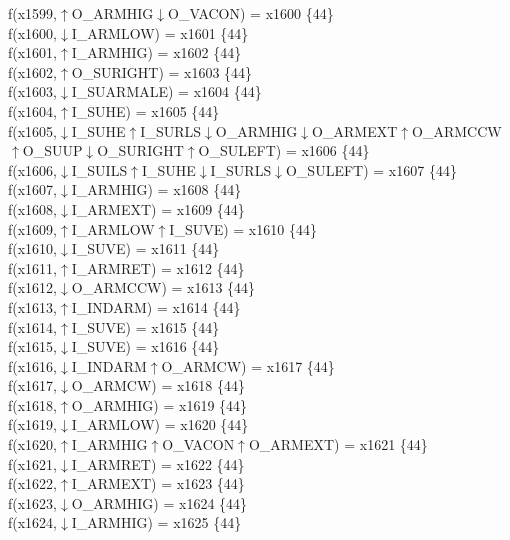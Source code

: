 f(x1599,$\uparrow$O\_ARMHIG$\downarrow$O\_VACON) = x1600 \{44\} \\  
f(x1600,$\downarrow$I\_ARMLOW) = x1601 \{44\} \\  
f(x1601,$\uparrow$I\_ARMHIG) = x1602 \{44\} \\  
f(x1602,$\uparrow$O\_SURIGHT) = x1603 \{44\} \\  
f(x1603,$\downarrow$I\_SUARMALE) = x1604 \{44\} \\  
f(x1604,$\uparrow$I\_SUHE) = x1605 \{44\} \\  
f(x1605,$\downarrow$I\_SUHE$\uparrow$I\_SURLS$\downarrow$O\_ARMHIG$\downarrow$O\_ARMEXT$\uparrow$O\_ARMCCW$\uparrow$O\_SUUP$\downarrow$O\_SURIGHT$\uparrow$O\_SULEFT) = x1606 \{44\} \\  
f(x1606,$\downarrow$I\_SUILS$\uparrow$I\_SUHE$\downarrow$I\_SURLS$\downarrow$O\_SULEFT) = x1607 \{44\} \\  
f(x1607,$\downarrow$I\_ARMHIG) = x1608 \{44\} \\  
f(x1608,$\downarrow$I\_ARMEXT) = x1609 \{44\} \\  
f(x1609,$\uparrow$I\_ARMLOW$\uparrow$I\_SUVE) = x1610 \{44\} \\  
f(x1610,$\downarrow$I\_SUVE) = x1611 \{44\} \\  
f(x1611,$\uparrow$I\_ARMRET) = x1612 \{44\} \\  
f(x1612,$\downarrow$O\_ARMCCW) = x1613 \{44\} \\  
f(x1613,$\uparrow$I\_INDARM) = x1614 \{44\} \\  
f(x1614,$\uparrow$I\_SUVE) = x1615 \{44\} \\  
f(x1615,$\downarrow$I\_SUVE) = x1616 \{44\} \\  
f(x1616,$\downarrow$I\_INDARM$\uparrow$O\_ARMCW) = x1617 \{44\} \\  
f(x1617,$\downarrow$O\_ARMCW) = x1618 \{44\} \\  
f(x1618,$\uparrow$O\_ARMHIG) = x1619 \{44\} \\  
f(x1619,$\downarrow$I\_ARMLOW) = x1620 \{44\} \\  
f(x1620,$\uparrow$I\_ARMHIG$\uparrow$O\_VACON$\uparrow$O\_ARMEXT) = x1621 \{44\} \\  
f(x1621,$\downarrow$I\_ARMRET) = x1622 \{44\} \\  
f(x1622,$\uparrow$I\_ARMEXT) = x1623 \{44\} \\  
f(x1623,$\downarrow$O\_ARMHIG) = x1624 \{44\} \\  
f(x1624,$\downarrow$I\_ARMHIG) = x1625 \{44\} \\  
